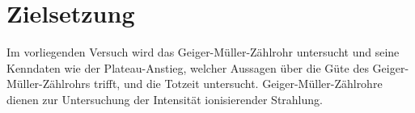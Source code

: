 \section{Zielsetzung}
\setcounter {page}{1}
\label{sec:Zielsetzung}
Im vorliegenden Versuch wird das Geiger-Müller-Zählrohr untersucht und seine Kenndaten wie der Plateau-Anstieg, welcher Aussagen über die Güte des Geiger-Müller-Zählrohrs trifft, und die Totzeit untersucht.
Geiger-Müller-Zählrohre dienen zur Untersuchung der Intensität ionisierender Strahlung.

